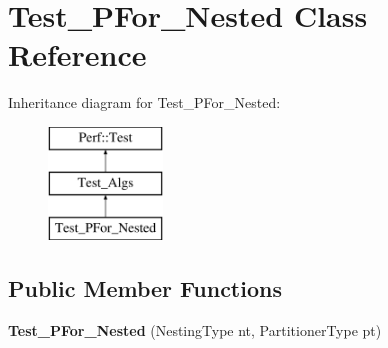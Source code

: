\hypertarget{classTest__PFor__Nested}{}\section{Test\+\_\+\+P\+For\+\_\+\+Nested Class Reference}
\label{classTest__PFor__Nested}
Inheritance diagram for Test\+\_\+\+P\+For\+\_\+\+Nested\+:\begin{figure}[H]
\begin{center}
\leavevmode
\includegraphics[height=3.000000cm]{classTest__PFor__Nested}
\end{center}
\end{figure}
\subsection*{Public Member Functions}
\begin{DoxyCompactItemize}
\item 
\hypertarget{classTest__PFor__Nested_ab21ad9a9ae491b098e2fb6d657a31ba8}{}{\bfseries Test\+\_\+\+P\+For\+\_\+\+Nested} (Nesting\+Type nt, Partitioner\+Type pt)\label{classTest__PFor__Nested_ab21ad9a9ae491b098e2fb6d657a31ba8}

\end{DoxyCompactItemize}
